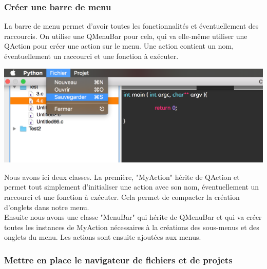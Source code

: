 \documentclass[a4paper,12pt]{article}
\begin{document}
			\subsubsection*{Créer une barre de menu}
			
				La barre de menu permet d'avoir toutes les fonctionnalités et éventuellement des raccourcis. On utilise une QMenuBar pour cela, qui va elle-même utiliser une QAction pour créer une action sur le menu. Une action contient un nom, éventuellement un raccourci et une fonction à exécuter. \\
			\begin{center}
				\includegraphics[scale=0.6]{images/QMenuBar}
				\vspace{0.5cm}
			\end{center}
			Nous avons ici deux classes. La première, "MyAction" hérite de QAction et permet tout simplement d'initialiser une action avec son nom, éventuellement un raccourci et une fonction à exécuter. Cela permet de compacter la création d'onglets dans notre menu.\\
			Ensuite nous avons une classe "MenuBar" qui hérite de QMenuBar et qui va créer toutes les instances de MyAction nécessaires à la créations des sous-menus et des onglets du menu. Les actions sont ensuite ajoutées aux menus.\\
			
			\subsubsection*{Mettre en place le navigateur de fichiers et de projets}
			
\end{document}
